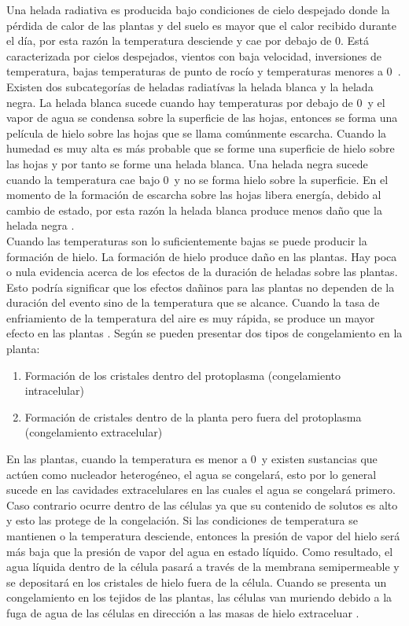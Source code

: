 Una helada radiativa es producida bajo condiciones de cielo despejado donde la pérdida de calor de las plantas y del suelo es mayor que el calor recibido durante el día, por esta razón la temperatura desciende y cae por debajo de 0\celc. Está caracterizada por cielos despejados, vientos con baja velocidad, inversiones de temperatura, bajas temperaturas de punto de rocío y temperaturas menores a 0\celc \   \citep{Halley2003, IDEAM2012a}. Existen dos subcategorías de heladas radiatívas la helada blanca y la helada negra. La helada blanca sucede cuando hay temperaturas por debajo de 0\celc \  y el vapor de agua se condensa sobre la superficie de las hojas, entonces se forma una película de hielo sobre las hojas que se llama comúnmente escarcha. Cuando la humedad es muy alta es más probable que se forme una superficie de hielo sobre las hojas y por tanto se forme una helada blanca. Una helada negra sucede cuando la temperatura cae bajo 0\celc \ y no se forma hielo sobre la superficie. En el momento de la formación de escarcha sobre las hojas libera energía, debido al cambio de estado, por esta razón la helada blanca produce menos daño que la helada negra \citep{Snyder2010}.\\

Cuando las temperaturas son lo suficientemente bajas se puede producir la formación de hielo. La formación de hielo produce daño en las plantas. Hay poca o nula evidencia acerca de los efectos de la duración de heladas sobre las plantas. Esto podría significar que los efectos dañinos para las plantas no dependen de la duración del evento sino de la temperatura que se alcance. Cuando la tasa de enfriamiento de la temperatura del aire es muy rápida, se produce un mayor efecto en las plantas \citep{Snyder2010}. Según \citet{Snyder2005} se pueden presentar dos tipos de congelamiento en la planta:

\begin{enumerate}
\item Formación de los cristales dentro del protoplasma (congelamiento intracelular)
\item Formación de cristales dentro de la planta pero fuera del protoplasma (congelamiento extracelular)
\end{enumerate}

En las plantas, cuando la temperatura es menor a 0\celc \  y existen sustancias que actúen como nucleador heterogéneo, el agua se congelará, esto por lo general sucede en las cavidades extracelulares en las cuales el agua se congelará primero. Caso contrario ocurre dentro de las células ya que su contenido de solutos es alto y esto las protege de la congelación. Si las condiciones de temperatura se mantienen o la temperatura desciende, entonces la presión de vapor del hielo será más baja que la presión de vapor del agua en estado líquido. Como resultado, el agua líquida dentro de la célula pasará a través de la membrana semipermeable y se depositará en los cristales de hielo fuera de la célula. Cuando se presenta un congelamiento en los tejidos de las plantas, las células van muriendo debido a la fuga de agua de las células en dirección a las masas de hielo extraceluar \citep{levitt2012chilling, pearce2001plant}.

